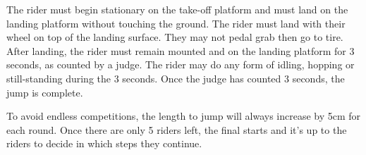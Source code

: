 The rider must begin stationary on the take-off platform and must land on the landing platform without touching the ground.
The rider must land with their wheel on top of the landing surface.
They may not pedal grab then go to tire.
After landing, the rider must remain mounted and on the landing platform for 3 seconds, as counted by a judge.
The rider may do any form of idling, hopping or still-standing during the 3 seconds.
Once the judge has counted 3 seconds, the jump is complete.

To avoid endless competitions, the length to jump will always increase by 5cm for each round.
Once there are only 5 riders left, the final starts and it's up to the riders to decide in which steps they continue.

